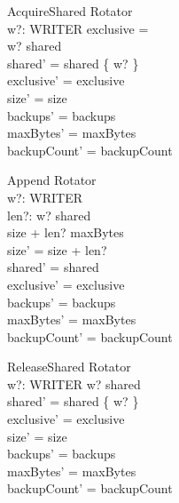\documentclass{article}
\begin{document}
\begin{schema}{AcquireShared}
  \Delta Rotator \\
  w?: WRITER
\where
  exclusive = \emptyset \\
  w? \notin shared \\
  shared' = shared \cup \{ w? \} \\
  exclusive' = exclusive \\
  size' = size \\
  backups' = backups \\
  maxBytes' = maxBytes \\
  backupCount' = backupCount
\end{schema}

\begin{schema}{Append}
  \Delta Rotator \\
  w?: WRITER \\
  len?: \nat
\where
  w? \in shared \\
  size + len? \leq maxBytes \\
  size' = size + len? \\
  shared' = shared \\
  exclusive' = exclusive \\
  backups' = backups \\
  maxBytes' = maxBytes \\
  backupCount' = backupCount
\end{schema}

\begin{schema}{ReleaseShared}
  \Delta Rotator \\
  w?: WRITER
\where
  w? \in shared \\
  shared' = shared \setminus \{ w? \} \\
  exclusive' = exclusive \\
  size' = size \\
  backups' = backups \\
  maxBytes' = maxBytes \\
  backupCount' = backupCount
\end{schema}
\end{document}
